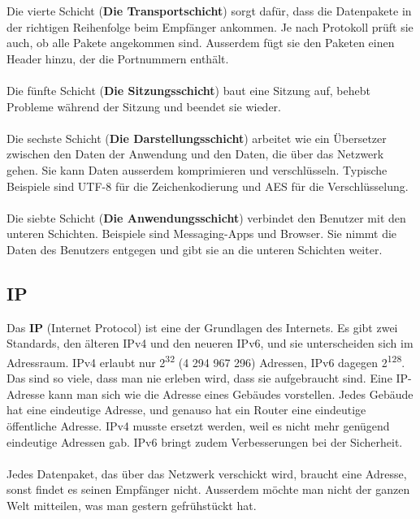 Die vierte Schicht (\textbf{Die Transportschicht}) sorgt dafür, dass die Datenpakete in der richtigen Reihenfolge beim Empfänger ankommen. Je nach Protokoll prüft sie auch, ob alle Pakete angekommen sind. Ausserdem fügt sie den Paketen einen Header hinzu, der die Portnummern enthält.\\\\

Die fünfte Schicht (\textbf{Die Sitzungsschicht}) baut eine Sitzung auf, behebt Probleme während der Sitzung und beendet sie wieder.\\\\

Die sechste Schicht (\textbf{Die Darstellungsschicht}) arbeitet wie ein Übersetzer zwischen den Daten der Anwendung und den Daten, die über das Netzwerk gehen. Sie kann Daten ausserdem komprimieren und verschlüsseln. Typische Beispiele sind UTF-8 für die Zeichenkodierung und AES für die Verschlüsselung.\\\\

Die siebte Schicht (\textbf{Die Anwendungsschicht}) verbindet den Benutzer mit den unteren Schichten. Beispiele sind Messaging-Apps und Browser. Sie nimmt die Daten des Benutzers entgegen und gibt sie an die unteren Schichten weiter.

\subsection{IP}

Das \textbf{IP} (Internet Protocol) ist eine der Grundlagen des Internets. Es gibt zwei Standards, den älteren IPv4 und den neueren IPv6, und sie unterscheiden sich im Adressraum. IPv4 erlaubt nur 2\textsuperscript{32} (4 294 967 296) Adressen, IPv6 dagegen 2\textsuperscript{128}. Das sind so viele, dass man nie erleben wird, dass sie aufgebraucht sind. Eine IP-Adresse kann man sich wie die Adresse eines Gebäudes vorstellen. Jedes Gebäude hat eine eindeutige Adresse, und genauso hat ein Router eine eindeutige öffentliche Adresse. IPv4 musste ersetzt werden, weil es nicht mehr genügend eindeutige Adressen gab. IPv6 bringt zudem Verbesserungen bei der Sicherheit.\\\\
Jedes Datenpaket, das über das Netzwerk verschickt wird, braucht eine Adresse, sonst findet es seinen Empfänger nicht. Ausserdem möchte man nicht der ganzen Welt mitteilen, was man gestern gefrühstückt hat.

